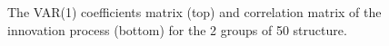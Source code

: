 \documentclass[
  11pt,
  letterpaper,
  DIV=11,
  numbers=noendperiod,
  titlepage]{scrartcl}
\begin{document}
\begin{figure}


\caption{\label{fig-settings-2x50}The VAR(1) coefficients matrix (top)
and correlation matrix of the innovation process (bottom) for the 2
groups of 50 structure.}

\end{figure}%
\end{document}
